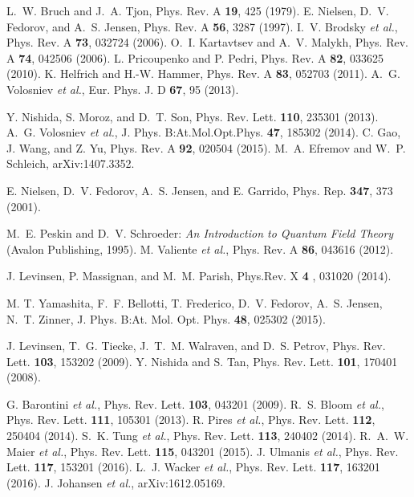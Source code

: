 \documentclass[twocolumn,showpacs,aps,prl,10pt]{revtex4}
\begin{document}
\begin{thebibliography}{99}
 L.~W. Bruch and J.~A. Tjon, Phys. Rev. A {\bf 19}, 425 (1979). 
 E. Nielsen, D.~V. Fedorov, and A.~S. Jensen, Phys. Rev. A {\bf 56}, 3287 (1997).
 I.~V. Brodsky {\it et al.}, Phys. Rev. A {\bf 73}, 032724 (2006).
 O.~I. Kartavtsev and A.~V. Malykh, Phys. Rev. A {\bf 74}, 042506 (2006).
 L. Pricoupenko and P. Pedri, Phys. Rev. A {\bf 82}, 033625 (2010).
 K. Helfrich and H.-W. Hammer, Phys. Rev. A {\bf 83}, 052703 (2011).
 A.~G. Volosniev {\it et al.}, Eur. Phys. J. D {\bf 67}, 95 (2013).

 Y. Nishida, S. Moroz, and D.~T. Son, Phys. Rev. Lett. {\bf 110}, 235301 (2013).
 A.~G. Volosniev {\it et al.}, J. Phys. B:At.Mol.Opt.Phys. {\bf 47}, 185302 (2014).
 C. Gao, J. Wang, and Z. Yu, Phys. Rev. A {\bf 92}, 020504 (2015).
 M.~A. Efremov and W.~P. Schleich, arXiv:1407.3352.

 E. Nielsen, D.~V. Fedorov, A.~S. Jensen, and E. Garrido,
  Phys. Rep. \textbf{347}, 373 (2001).


 M.~E. Peskin and D.~V. Schroeder: \emph{An Introduction to Quantum Field Theory} (Avalon Publishing, 1995).
 M. Valiente {\it et al.}, Phys. Rev. A {\bf 86}, 043616 (2012).



  

 J. Levinsen, P. Massignan, and M.~M. Parish,
Phys.Rev. X {\bf 4} , 031020 (2014).

 M. T. Yamashita, F.~F. Bellotti, T. Frederico,
  D.~V. Fedorov, A.~S. Jensen, N.~T. Zinner, J. Phys. B:At. Mol. Opt. Phys. {\bf 48}, 025302 (2015).

 J. Levinsen, T.~G. Tiecke, J.~T.~M. Walraven, and D.~S. Petrov, Phys. Rev. Lett. {\bf 103}, 153202 (2009).
 Y. Nishida and S. Tan, Phys. Rev. Lett. {\bf 101}, 170401 (2008).

 G. Barontini {\it et al.}, Phys. Rev. Lett. {\bf 103}, 043201 (2009).
 R.~S. Bloom {\it et al.}, Phys. Rev. Lett. {\bf 111}, 105301 (2013).
 R. Pires {\it et al.}, Phys. Rev. Lett. {\bf 112}, 250404 (2014).
 S.~K. Tung {\it et al.}, Phys. Rev. Lett. {\bf 113}, 240402 (2014).
 R.~A.~W. Maier {\it et al.}, Phys. Rev. Lett. {\bf 115}, 043201 (2015).
 J. Ulmanis {\it et al.}, Phys. Rev. Lett. {\bf 117}, 153201 (2016). 
 L.~J. Wacker {\it et al.}, Phys. Rev. Lett. {\bf 117}, 163201 (2016).
 J. Johansen {\it et al.}, arXiv:1612.05169.


\end{thebibliography}
\end{document}
